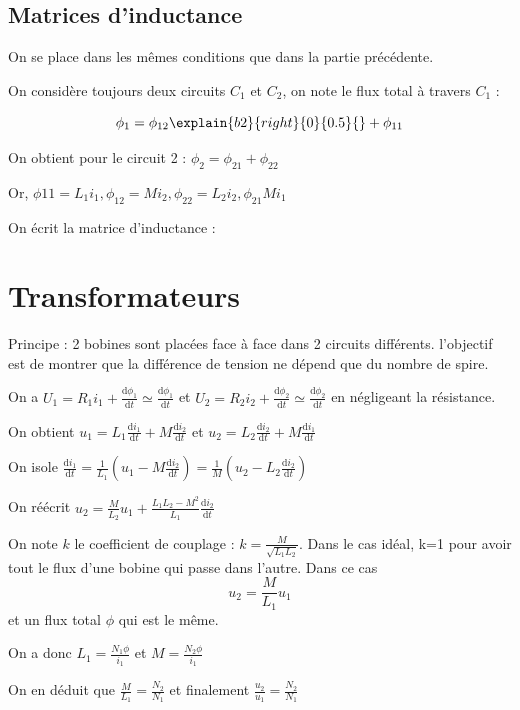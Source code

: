 \documentclass[french]{yLectureNote}
\newcommand{\dd}{\mathrm{d}}
\begin{document}
\subsection{Matrices d'inductance}
On se place dans les m\^emes conditions que dans la partie précédente.

On considère toujours deux circuits $C_1$ et $C_2$, on note le flux total à travers $C_1$ : 


$$\phi_1 = \phi_{12}\explain{b2}{right}{0}{0.5}{}+\phi_{11}$$

On obtient pour le circuit 2 : $\phi_{2} = \phi_{21}+\phi_{22}$

Or, $\phi{11} = L_1i_1, \phi_{12} = Mi_2, \phi_{22}=L_2i_2, \phi_{21}M i_1$

On écrit la matrice d'inductance : %

\section{Transformateurs}
Principe : 2 bobines sont placées face à face dans 2 circuits différents. l'objectif est de montrer que la différence de tension ne dépend que du nombre de spire.

On a $U_1 = R_1i_1 + \frac{\dd \phi_1}{\dd t}\simeq \frac{\dd \phi_1}{\dd t}$ et $U_2 = R_2i_2 + \frac{\dd \phi_2}{\dd t}\simeq \frac{\dd \phi_2}{\dd t}$ en négligeant la résistance.

On obtient $u_1 = L_1\frac{\dd i_1}{\dd t} + M\frac{\dd i_2}{\dd t}$ et
$u_2 = L_2\frac{\dd i_2}{\dd t} + M\frac{\dd i_1}{\dd t}$

On isole $\frac{\dd i_1}{\dd t} = \frac{1}{L_1}(u_1-M\frac{\dd i_2}{\dd t}) = \frac{1}{M}(u_2-L_2\frac{\dd i_2}{\dd t})$

On réécrit $u_2 = \frac{M}{L_2}u_1 + \frac{L_1L_2-M^2}{L_1}\frac{\dd i_2}{\dd t}$

On note $k$ le coefficient de couplage : $k = \frac{M}{\sqrt{L_1L_2}}$. Dans le cas idéal, k=1 pour avoir tout le flux d'une bobine qui
passe dans l'autre. Dans ce cas 
$$u_2 = \frac{M}{L_1}u_1$$ et un flux total $\phi$ qui est le m\^eme.

On a donc $L_1 = \frac{N_1\phi}{i_1}$ et $M=\frac{N_2\phi}{i_1}$

On en déduit que $\frac{M}{L_1}=\frac{N_2}{N_1}$ et finalement $\frac{u_2}{u_1} = \frac{N_2}{N_1}$
\end{document}
